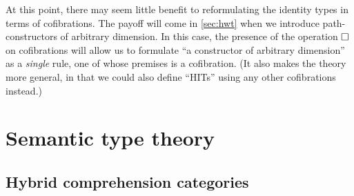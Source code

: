 \documentclass{amsart}
\begin{document}
At this point, there may seem little benefit to reformulating the identity types in terms of cofibrations.
The payoff will come in \cref{sec:hwt} when we introduce path-constructors of arbitrary dimension.
In this case, the presence of the operation $\Box$ on cofibrations will allow us to formulate ``a constructor of arbitrary dimension'' as a \emph{single} rule, one of whose premises is a cofibration.
(It also makes the theory more general, in that we could also define ``HITs'' using any other cofibrations instead.)


\section{Semantic type theory}
\label{sec:semantic-type-theory}

\subsection{Hybrid comprehension categories}
\label{sec:hybrid-ccs}
\end{document}
